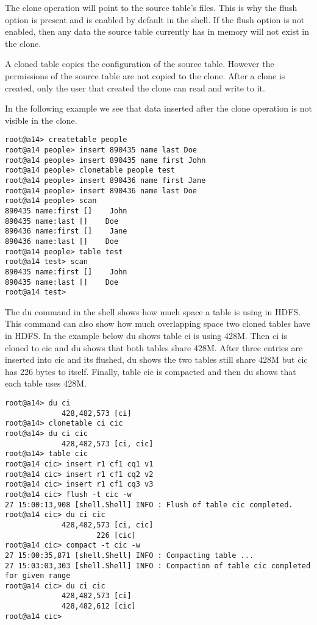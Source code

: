 The clone operation will point to the source table's files.  This is why the
flush option is present and is enabled by default in the shell.  If the flush
option is not enabled, then any data the source table currently has in memory
will not exist in the clone.

A cloned table copies the configuration of the source table.  However the
permissions of the source table are not copied to the clone.  After a clone is
created, only the user that created the clone can read and write to it.

In the following example we see that data inserted after the clone operation is
not visible in the clone.

\small
\begin{verbatim}
root@a14> createtable people
root@a14 people> insert 890435 name last Doe
root@a14 people> insert 890435 name first John
root@a14 people> clonetable people test  
root@a14 people> insert 890436 name first Jane
root@a14 people> insert 890436 name last Doe  
root@a14 people> scan
890435 name:first []    John
890435 name:last []    Doe
890436 name:first []    Jane
890436 name:last []    Doe
root@a14 people> table test
root@a14 test> scan
890435 name:first []    John
890435 name:last []    Doe
root@a14 test> 
\end{verbatim}
\normalsize

The du command in the shell shows how much space a table is using in HDFS.
This command can also show how much overlapping space two cloned tables have in
HDFS.  In the example below du shows table ci is using 428M.  Then ci is cloned
to cic and du shows that both tables share 428M.  After three entries are
inserted into cic and its flushed, du shows the two tables still share 428M but
cic has 226 bytes to itself.  Finally, table cic is compacted and then du shows
that each table uses 428M.

\small
\begin{verbatim}
root@a14> du ci           
             428,482,573 [ci]
root@a14> clonetable ci cic
root@a14> du ci cic
             428,482,573 [ci, cic]
root@a14> table cic
root@a14 cic> insert r1 cf1 cq1 v1
root@a14 cic> insert r1 cf1 cq2 v2
root@a14 cic> insert r1 cf1 cq3 v3 
root@a14 cic> flush -t cic -w 
27 15:00:13,908 [shell.Shell] INFO : Flush of table cic completed.
root@a14 cic> du ci cic       
             428,482,573 [ci, cic]
                     226 [cic]
root@a14 cic> compact -t cic -w
27 15:00:35,871 [shell.Shell] INFO : Compacting table ...
27 15:03:03,303 [shell.Shell] INFO : Compaction of table cic completed for given range
root@a14 cic> du ci cic        
             428,482,573 [ci]
             428,482,612 [cic]
root@a14 cic> 
\end{verbatim}
\normalsize


